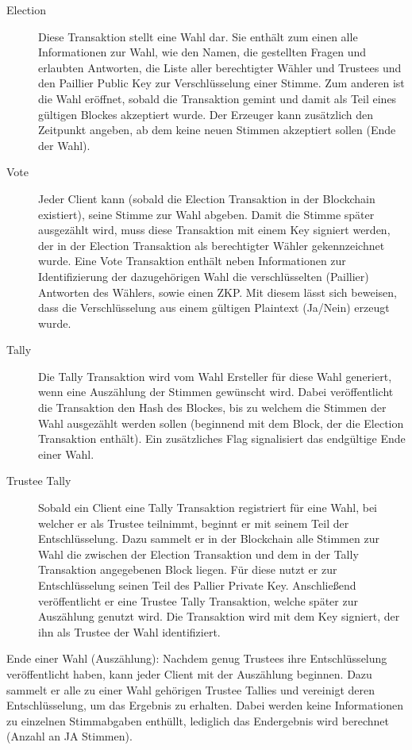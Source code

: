 \documentclass[colorback,accentcolor=tud1b]{tudreport}
\begin{document}
\begin{description}
\item[Election] Diese Transaktion stellt eine Wahl dar. Sie enthält zum einen alle Informationen zur Wahl, wie den Namen, die gestellten Fragen und erlaubten Antworten, die Liste aller berechtigter Wähler und Trustees und den Paillier Public Key zur Verschlüsselung einer Stimme. Zum anderen ist die Wahl eröffnet, sobald die Transaktion gemint und damit als Teil eines gültigen Blockes akzeptiert wurde. Der Erzeuger kann zusätzlich den Zeitpunkt angeben, ab dem keine neuen Stimmen akzeptiert sollen (Ende der Wahl).

\item[Vote] Jeder Client kann (sobald die Election Transaktion in der Blockchain existiert), seine Stimme zur Wahl abgeben. Damit die Stimme später ausgezählt wird, muss diese Transaktion mit einem Key signiert werden, der in der Election Transaktion als berechtigter Wähler gekennzeichnet wurde. Eine Vote Transaktion enthält neben Informationen zur Identifizierung der dazugehörigen Wahl die verschlüsselten (Paillier) Antworten des Wählers, sowie einen ZKP. Mit diesem lässt sich beweisen, dass die Verschlüsselung aus einem gültigen Plaintext (Ja/Nein) erzeugt wurde.

\item[Tally] Die Tally Transaktion wird vom Wahl Ersteller für diese Wahl generiert, wenn eine Auszählung der Stimmen gewünscht wird. Dabei veröffentlicht die Transaktion den Hash des Blockes, bis zu welchem die Stimmen der Wahl ausgezählt werden sollen (beginnend mit dem Block, der die Election Transaktion enthält). Ein zusätzliches Flag signalisiert das endgültige Ende einer Wahl.

\item[Trustee Tally] Sobald ein Client eine Tally Transaktion registriert für eine Wahl, bei welcher er als Trustee teilnimmt, beginnt er mit seinem Teil der Entschlüsselung. Dazu sammelt er in der Blockchain alle Stimmen zur Wahl die zwischen der Election Transaktion und dem in der Tally Transaktion angegebenen Block liegen. Für diese nutzt er zur Entschlüsselung seinen Teil des Pallier Private Key. Anschließend veröffentlicht er eine Trustee Tally Transaktion, welche später zur Auszählung genutzt wird. Die Transaktion wird mit dem Key signiert, der ihn als Trustee der Wahl identifiziert.
\end{description}
Ende einer Wahl (Auszählung):
Nachdem genug Trustees ihre Entschlüsselung veröffentlicht haben, kann jeder Client mit der Auszählung beginnen. Dazu sammelt er alle zu einer Wahl gehörigen Trustee Tallies und vereinigt deren Entschlüsselung, um das Ergebnis zu erhalten. Dabei werden keine Informationen zu einzelnen Stimmabgaben enthüllt, lediglich das Endergebnis wird berechnet (Anzahl an JA Stimmen).
\end{document}
